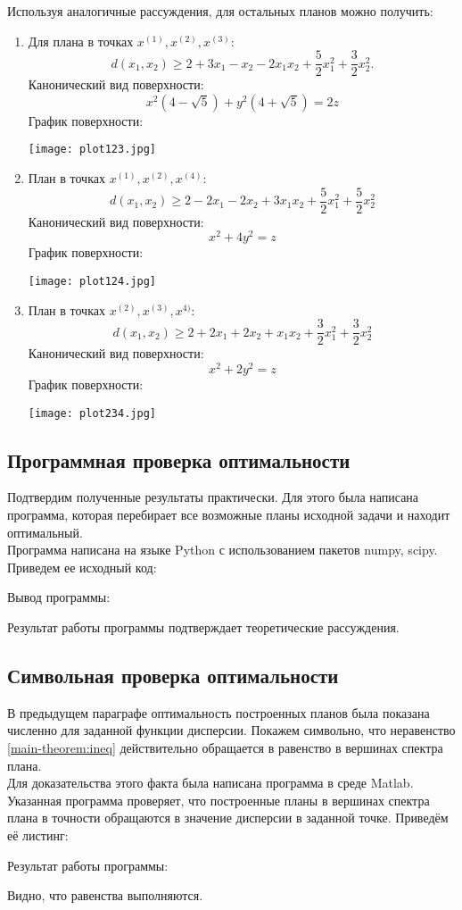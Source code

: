 Используя аналогичные рассуждения, для остальных планов можно получить:
\begin{enumerate}
	\item Для плана в точках $x^{(1)}, x^{(2)}, x^{(3)}$:
	$$d(x_1, x_2) \ge 2 + 3x_1 - x_2 -2x_1x_2 +\frac{5}{2}x_1^2 + \frac 3 2 x_2^2.$$
	Канонический вид поверхности:
	$$x^2 (4 - \sqrt{5}) + y^2 (4 + \sqrt 5) = 2z$$
	График поверхности:\\
	\begin{center}\texttt{[image: plot123.jpg]}\end{center}
	
	\item План в точках $x^{(1)}, x^{(2)}, x^{(4)}$:
	$$d(x_1, x_2) \ge 2 - 2x_1 - 2x_2 +3x_1x_2 +\frac{5}{2}x_1^2 + \frac 5 2 x_2^2$$
	Канонический вид поверхности:
	$$x^2 + 4y^2 = z$$
	График поверхности:\\
	\begin{center}\texttt{[image: plot124.jpg]}\end{center}
	\item План в точках $x^{(2)}, x^{(3)}, x^{4)}$:
	$$d(x_1, x_2) \ge 2 + 2x_1 + 2x_2 +x_1x_2 +\frac{3}{2}x_1^2 + \frac 3 2 x_2^2$$
	Канонический вид поверхности:
	$$x^2 + 2 y^2 = z$$
	График поверхности:\\
	\begin{center}\texttt{[image: plot234.jpg]}\end{center}
\end{enumerate}

\subsection{Программная проверка оптимальности}
Подтвердим полученные результаты практически. Для этого была написана программа, которая перебирает все возможные планы исходной задачи и находит оптимальный.\\
Программа написана на языке Python с использованием пакетов numpy, scipy.\\
Приведем ее исходный код:


Вывод программы:

Результат работы программы подтверждает теоретические рассуждения.


\subsection {Символьная проверка оптимальности}
В предыдущем параграфе оптимальность построенных планов была показана численно для заданной функции дисперсии. Покажем символьно, что неравенство \eqref{main-theorem:ineq} действительно обращается в равенство в вершинах спектра плана.\\
Для доказательства этого факта была написана программа в среде Matlab.
Указанная программа проверяет, что построенные планы в вершинах спектра плана в точности обращаются в значение дисперсии в заданной точке.
Приведём её листинг:


Результат работы программы:


Видно, что равенства выполняются.